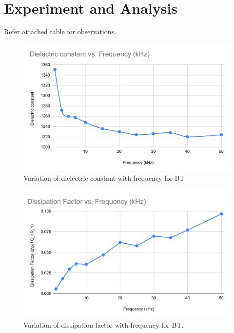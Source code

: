 \documentclass[a4paper, amsfonts, amssymb, amsmath, reprint, showkeys, nofootinbib, twoside]{revtex4-1}
\begin{document}
\section{Experiment and Analysis}

Refer attached table for observations.

\begin{figure}[H]
	\centering
	\includegraphics[scale=0.4]{a}
	\caption{Variation of dielectric constant with frequency for BT}
	\label{1}
\end{figure}

\begin{figure}[H]
	\centering
	\includegraphics[scale=0.4]{f}
	\caption{Variation of dissipation factor with frequency for BT.}
	\label{1}
\end{figure}
\end{document}
